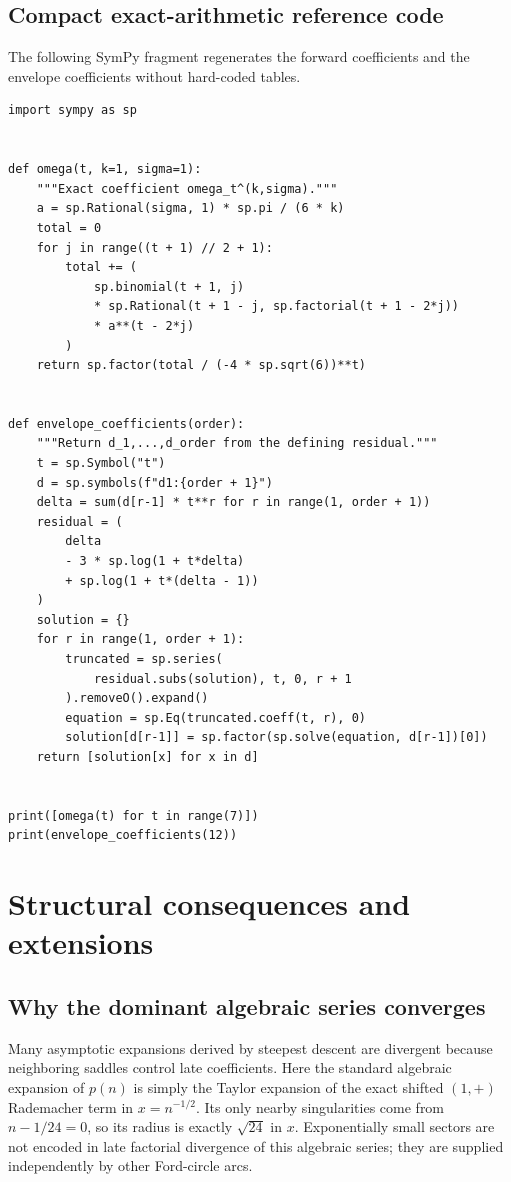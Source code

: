 \documentclass[11pt]{article}
\numberwithin{equation}{section}
\theoremstyle{mainthm}
\theoremstyle{defstyle}
\theoremstyle{remark}
\begin{document}
\subsection{Compact exact-arithmetic reference code}

The following SymPy fragment regenerates the forward coefficients and the envelope coefficients without hard-coded tables.

\begin{lstlisting}
import sympy as sp


def omega(t, k=1, sigma=1):
    """Exact coefficient omega_t^(k,sigma)."""
    a = sp.Rational(sigma, 1) * sp.pi / (6 * k)
    total = 0
    for j in range((t + 1) // 2 + 1):
        total += (
            sp.binomial(t + 1, j)
            * sp.Rational(t + 1 - j, sp.factorial(t + 1 - 2*j))
            * a**(t - 2*j)
        )
    return sp.factor(total / (-4 * sp.sqrt(6))**t)


def envelope_coefficients(order):
    """Return d_1,...,d_order from the defining residual."""
    t = sp.Symbol("t")
    d = sp.symbols(f"d1:{order + 1}")
    delta = sum(d[r-1] * t**r for r in range(1, order + 1))
    residual = (
        delta
        - 3 * sp.log(1 + t*delta)
        + sp.log(1 + t*(delta - 1))
    )
    solution = {}
    for r in range(1, order + 1):
        truncated = sp.series(
            residual.subs(solution), t, 0, r + 1
        ).removeO().expand()
        equation = sp.Eq(truncated.coeff(t, r), 0)
        solution[d[r-1]] = sp.factor(sp.solve(equation, d[r-1])[0])
    return [solution[x] for x in d]


print([omega(t) for t in range(7)])
print(envelope_coefficients(12))
\end{lstlisting}

\section{Structural consequences and extensions}\label{sec:extensions}

\subsection{Why the dominant algebraic series converges}

Many asymptotic expansions derived by steepest descent are divergent because neighboring saddles control late coefficients.  Here the standard algebraic expansion of \(p(n)\) is simply the Taylor expansion of the exact shifted \((1,+)\) Rademacher term in \(x=n^{-1/2}\).  Its only nearby singularities come from \(n-1/24=0\), so its radius is exactly \(\sqrt{24}\) in \(x\).  Exponentially small sectors are not encoded in late factorial divergence of this algebraic series; they are supplied independently by other Ford-circle arcs.
\end{document}
